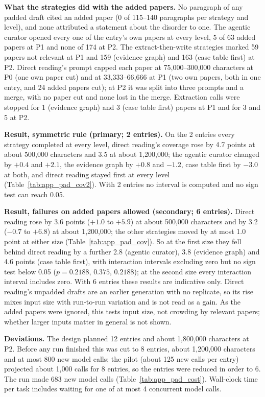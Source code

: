 \documentclass{article} %
\begin{document}
\textbf{What the strategies did with the added papers.} No paragraph of any padded draft cited an added paper (0 of 115--140 paragraphs per strategy and level), and none attributed a statement about the disorder to one. The agentic curator opened every one of the entry's own papers at every level, 5 of 63 added papers at P1 and none of 174 at P2. The extract-then-write strategies marked 59 papers not relevant at P1 and 159 (evidence graph) and 163 (case table first) at P2. Direct reading's prompt capped each paper at 75,000--300,000 characters at P0 (one own paper cut) and at 33,333--66,666 at P1 (two own papers, both in one entry, and 24 added papers cut); at P2 it was split into three prompts and a merge, with no paper cut and none lost in the merge. Extraction calls were stopped for 1 (evidence graph) and 3 (case table first) papers at P1 and for 3 and 5 at P2.

\textbf{Result, symmetric rule (primary; 2 entries).} On the 2 entries every strategy completed at every level, direct reading's coverage rose by 4.7 points at about 500,000 characters and 3.5 at about 1,200,000; the agentic curator changed by $+0.4$ and $+2.1$, the evidence graph by $+0.8$ and $-1.2$, case table first by $-3.0$ at both, and direct reading stayed first at every level (Table~\ref{tab:app_pad_cov2}). With 2 entries no interval is computed and no sign test can reach 0.05.

\textbf{Result, failures on added papers allowed (secondary; 6 entries).} Direct reading rose by 3.6 points ($+1.0$ to $+5.9$) at about 500,000 characters and by 3.2 ($-0.7$ to $+6.8$) at about 1,200,000; the other strategies moved by at most 1.0 point at either size (Table~\ref{tab:app_pad_cov}). So at the first size they fell behind direct reading by a further 2.8 (agentic curator), 3.8 (evidence graph) and 4.6 points (case table first), with interaction intervals excluding zero but no sign test below 0.05 ($p=0.2188$, $0.375$, $0.2188$); at the second size every interaction interval includes zero. With 6 entries these results are indicative only. Direct reading's unpadded drafts are an earlier generation with no replicate, so its rise mixes input size with run-to-run variation and is not read as a gain. As the added papers were ignored, this tests input size, not crowding by relevant papers; whether larger inputs matter in general is not shown.

\textbf{Deviations.} The design planned 12 entries and about 1,800,000 characters at P2. Before any run finished this was cut to 8 entries, about 1,200,000 characters and at most 800 new model calls; the pilot (about 125 new calls per entry) projected about 1,000 calls for 8 entries, so the entries were reduced in order to 6. The run made 683 new model calls (Table~\ref{tab:app_pad_cost}). Wall-clock time per task includes waiting for one of at most 4 concurrent model calls.
\end{document}
